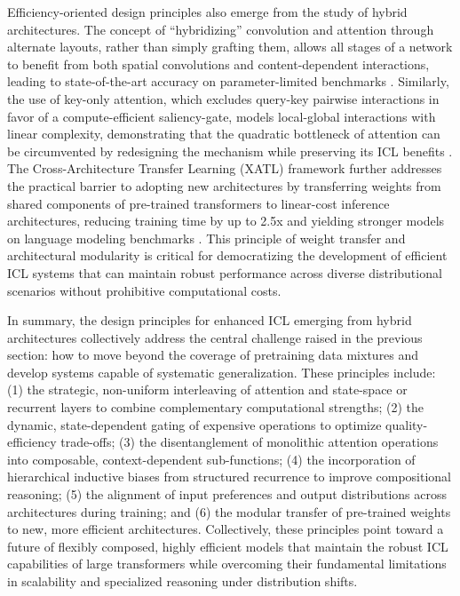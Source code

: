 \documentclass[11pt]{article}
\begin{document}
Efficiency-oriented design principles also emerge from the study of hybrid architectures. The concept of ``hybridizing'' convolution and attention through alternate layouts, rather than simply grafting them, allows all stages of a network to benefit from both spatial convolutions and content-dependent interactions, leading to state-of-the-art accuracy on parameter-limited benchmarks \cite{ref123}. Similarly, the use of key-only attention, which excludes query-key pairwise interactions in favor of a compute-efficient saliency-gate, models local-global interactions with linear complexity, demonstrating that the quadratic bottleneck of attention can be circumvented by redesigning the mechanism while preserving its ICL benefits \cite{ref123}. The Cross-Architecture Transfer Learning (XATL) framework further addresses the practical barrier to adopting new architectures by transferring weights from shared components of pre-trained transformers to linear-cost inference architectures, reducing training time by up to 2.5x and yielding stronger models on language modeling benchmarks \cite{ref124}. This principle of weight transfer and architectural modularity is critical for democratizing the development of efficient ICL systems that can maintain robust performance across diverse distributional scenarios without prohibitive computational costs.

In summary, the design principles for enhanced ICL emerging from hybrid architectures collectively address the central challenge raised in the previous section: how to move beyond the coverage of pretraining data mixtures and develop systems capable of systematic generalization. These principles include: (1) the strategic, non-uniform interleaving of attention and state-space or recurrent layers to combine complementary computational strengths; (2) the dynamic, state-dependent gating of expensive operations to optimize quality-efficiency trade-offs; (3) the disentanglement of monolithic attention operations into composable, context-dependent sub-functions; (4) the incorporation of hierarchical inductive biases from structured recurrence to improve compositional reasoning; (5) the alignment of input preferences and output distributions across architectures during training; and (6) the modular transfer of pre-trained weights to new, more efficient architectures. Collectively, these principles point toward a future of flexibly composed, highly efficient models that maintain the robust ICL capabilities of large transformers while overcoming their fundamental limitations in scalability and specialized reasoning under distribution shifts.
\end{document}
